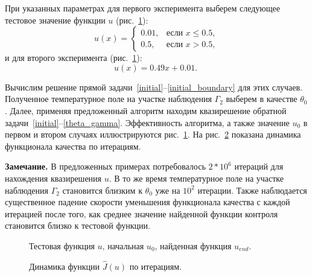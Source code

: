 \documentclass[10pt]{article}
\begin{document}
    При указанных параметрах для первого эксперимента выберем следующее тестовое значение
    функции $u$ (рис.~\ref{control}):
    \begin{equation}
        u(x)=
        \begin{cases}
            0.01, & \text{если } x \le 0.5, \\
            0.5, & \text{если } x > 0.5,
        \end{cases}
    \end{equation}
    и для второго эксперимента (рис.~\ref{control}):
    \begin{equation}
        \label{test_function_1}
        u(x)=0.49x+0.01. \;
    \end{equation}

    Вычислим решение прямой задачи~\eqref{initial}--\eqref{initial_boundary} для этих случаев.
    Полученное температурное поле на участке наблюдения $\Gamma_2$ выберем в качестве $\theta_0$.
    Далее, применяя предложенный алгоритм находим квазирешение обратной
    задачи~\eqref{initial}--\eqref{theta_gamma}.
    Эффективность алгоритма, а также значение $u_0$
    в первом и втором случаях иллюстрируются рис.~\ref{control}.
    На рис.~\ref{cost} показана динамика функционала качества по итерациям.

    \textbf{Замечание.} В предложенных примерах потребовалось $2*10^6$ итераций для нахождения
    квазирешения $u$.
    В то же время температурное поле на участке наблюдения
    $\Gamma_2$ становится близким к $\theta_0$ уже на $10^2$ итерации.
    Также наблюдается существенное падение скорости уменьшения функционала качества с каждой
    итерацией после того, как среднее значение найденной функции контроля
    становится близко к тестовой функции.
    \begin{figure}[H]
        \centering
        \caption{Тестовая функция $u$, начальная $u_0$, найденная функция $u_{end}.$}
        \label{control}
    \end{figure}

    \begin{figure}[H]
        \centering
        \caption{Динамика функции $\hat{J}(u)$ по итерациям.}
        \label{cost}
    \end{figure}


    
\end{document}
